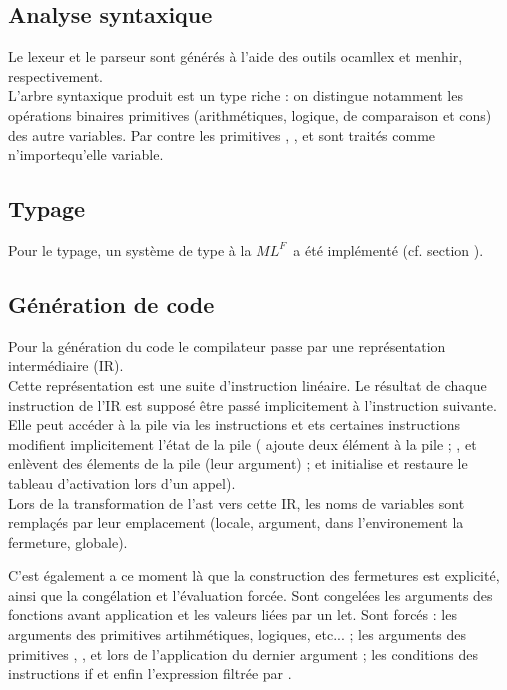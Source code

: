 \documentclass[a4paper]{article}
\def\mlf{$ML^F$}
\begin{document}
\subsection{Analyse syntaxique}
Le lexeur et le parseur sont générés à l'aide des outils ocamllex et menhir, respectivement. \\
L'arbre syntaxique produit est un type riche : on distingue notamment les opérations binaires primitives (arithmétiques, logique, de comparaison et cons) des autre variables. Par contre les primitives , ,  et  sont traités comme n'importequ'elle variable.

\subsection{Typage}
Pour le typage, un système de type \og à la \mlf \fg ~a été implémenté
(cf. section ). %

\subsection{Génération de code}
Pour la génération du code le compilateur passe par une représentation intermédiaire (IR). \\
Cette représentation est une suite d'instruction linéaire. Le résultat de chaque instruction de l'IR est supposé être passé implicitement à l'instruction suivante. \\
Elle peut accéder à la pile via les instructions  et  ets certaines instructions modifient implicitement l'état de la pile ( ajoute deux élément à la pile ; ,  et  enlèvent des élements de la pile (leur argument) ;  et  initialise et restaure le tableau d'activation lors d'un appel). \\
Lors de la transformation de l'ast vers cette IR, les noms de
variables sont remplaçés par leur emplacement (locale, argument, dans
l'environement la fermeture, globale).

C'est également a ce moment là que la construction des fermetures est
explicité, ainsi que la congélation et l'évaluation forcée. Sont
congelées les arguments des fonctions avant application et les valeurs
liées par un let. Sont forcés : les arguments des primitives
artihmétiques, logiques, etc... ; les arguments des primitives
, ,  et  lors de
l'application du dernier argument ; les conditions des instructions if
et enfin l'expression filtrée par .
\end{document}
